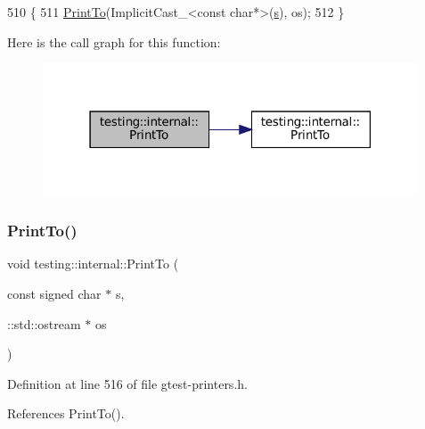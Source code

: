 \begin{DoxyCode}
510                                              \{
511   \hyperlink{namespacetesting_1_1internal_af2c33928facbf2edf7af564278724d98}{PrintTo}(ImplicitCast\_<const char*>(\hyperlink{namespaceservice__node__3_aa976421a49e0b54f23833423400849ae}{s}), os);
512 \}
\end{DoxyCode}
Here is the call graph for this function\+:
\nopagebreak
\begin{figure}[H]
\begin{center}
\leavevmode
\includegraphics[width=316pt]{namespacetesting_1_1internal_a553eec7bb50de01c9e91cac4accc606f_cgraph}
\end{center}
\end{figure}
\mbox{\label{namespacetesting_1_1internal_a792cc5665a34619ed7a6d54711433456}} 
\subsubsection{\texorpdfstring{Print\+To()}{PrintTo()}\hspace{0.1cm}{\footnotesize\ttfamily [12/20]}}
{\footnotesize\ttfamily void testing\+::internal\+::\+Print\+To (\begin{DoxyParamCaption}\item[{const signed char $\ast$}]{s,  }\item[{\+::std\+::ostream $\ast$}]{os }\end{DoxyParamCaption})\hspace{0.3cm}{\ttfamily [inline]}}



Definition at line 516 of file gtest-\/printers.\+h.



References Print\+To().


